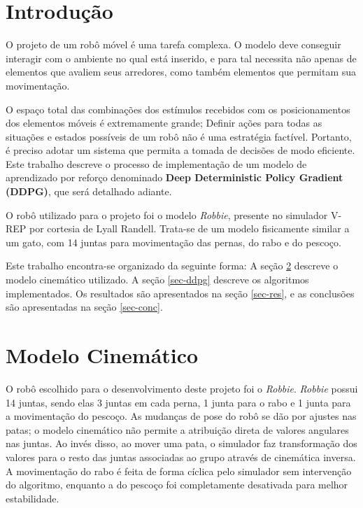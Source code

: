\documentclass[twoside,conference,a4paper]{IEEEtran}
\begin{document}

\section{Introdução}

O projeto de um robô móvel é uma tarefa complexa. O modelo deve conseguir interagir com o ambiente no qual está inserido, e para tal necessita não apenas de elementos que avaliem seus arredores, como também elementos que permitam sua movimentação. 

O espaço total das combinações dos estímulos recebidos com os posicionamentos dos elementos móveis é extremamente grande; Definir ações para todas as situações e estados possíveis de um robô não é uma estratégia factível. Portanto, é preciso adotar um sistema que permita a tomada de decisões de modo eficiente. Este trabalho descreve o processo de implementação de um modelo de aprendizado por reforço denominado \textbf{Deep Deterministic Policy Gradient (DDPG)\cite{Lillicrap:2016}\cite{DDPG}}, que será detalhado adiante.

O robô utilizado para o projeto foi o modelo \textit{Robbie}, presente no simulador V-REP por cortesia de Lyall Randell. Trata-se de um modelo fisicamente similar a um gato, com 14 juntas para movimentação das pernas, do rabo e do pescoço.

Este trabalho encontra-se organizado da seguinte forma: A seção \ref{sec-modcin} descreve o modelo cinemático utilizado. A seção \ref{sec-ddpg} descreve os algoritmos implementados. Os resultados são apresentados na seção \ref{sec-res}, e as conclusões são apresentadas na seção \ref{sec-conc}.

\section{Modelo Cinemático}\label{sec-modcin}

O robô escolhido para o desenvolvimento deste projeto foi o \textit{Robbie}. \textit{Robbie} possui 14 juntas, sendo elas 3 juntas em cada perna, 1 junta para o rabo e 1 junta para a movimentação do pescoço. As mudanças de pose do robô se dão por ajustes nas patas; o modelo cinemático não permite a atribuição direta de valores angulares nas juntas. Ao invés disso, ao mover uma pata, o simulador faz transformação dos valores para o resto das juntas associadas ao grupo através de cinemática inversa. A movimentação do rabo é feita de forma cíclica pelo simulador sem intervenção do algoritmo, enquanto a do pescoço foi completamente desativada para melhor estabilidade.
\end{document}
